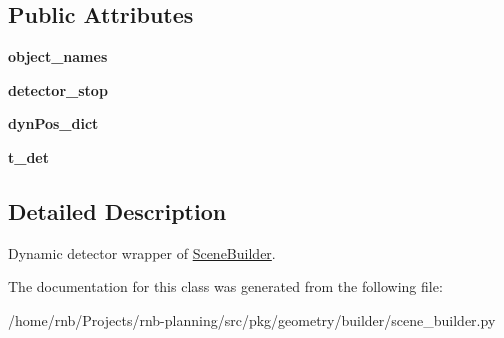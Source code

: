 \subsection*{Public Attributes}
\begin{DoxyCompactItemize}
\item 
\mbox{\label{classrnb-planning_1_1src_1_1pkg_1_1geometry_1_1builder_1_1scene__builder_1_1_dynamic_detector_adad4a4583ff2936883172391cc6f06bc}} 
{\bfseries object\+\_\+names}
\item 
\mbox{\label{classrnb-planning_1_1src_1_1pkg_1_1geometry_1_1builder_1_1scene__builder_1_1_dynamic_detector_a00f2026863eace4d7af82189027cd305}} 
{\bfseries detector\+\_\+stop}
\item 
\mbox{\label{classrnb-planning_1_1src_1_1pkg_1_1geometry_1_1builder_1_1scene__builder_1_1_dynamic_detector_a1f7443490c42346b6c4611238383da7f}} 
{\bfseries dyn\+Pos\+\_\+dict}
\item 
\mbox{\label{classrnb-planning_1_1src_1_1pkg_1_1geometry_1_1builder_1_1scene__builder_1_1_dynamic_detector_a0b440ba5e8525dcaa49f18938b61efca}} 
{\bfseries t\+\_\+det}
\end{DoxyCompactItemize}


\subsection{Detailed Description}
Dynamic detector wrapper of \hyperlink{classrnb-planning_1_1src_1_1pkg_1_1geometry_1_1builder_1_1scene__builder_1_1_scene_builder}{Scene\+Builder}. 

The documentation for this class was generated from the following file\+:\begin{DoxyCompactItemize}
\item 
/home/rnb/\+Projects/rnb-\/planning/src/pkg/geometry/builder/scene\+\_\+builder.\+py\end{DoxyCompactItemize}
